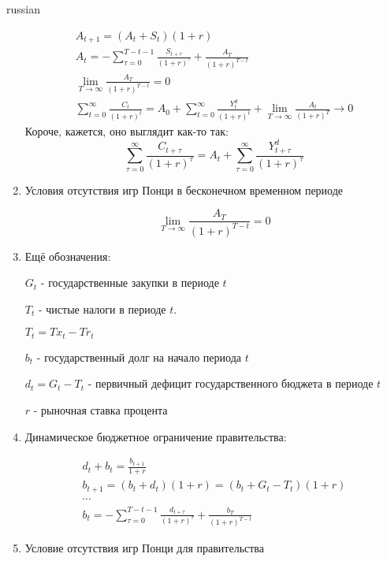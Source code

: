 \documentclass{article}
\begin{document}
\begin{otherlanguage*}{russian}
\begin{enumerate}
\begin{align}
A_{t+1} = (A_t + S_t) (1 + r) \\
A_t = - \sum_{\tau = 0 } ^{T - t -1 } \frac{S_{t + \tau}}{(1 + r)^{\tau}} + \frac{A_T}{(1 + r)^{T - t}}\\
\lim_{T \rightarrow \infty} \frac{A_T}{(1 + r)^{T - t}} = 0 \\
\sum_{t = 0}^{\infty} \frac{C_t}{(1 + r)^t} = A_0 + \sum_{t = 0 }^{\infty} \frac{Y^d_t}{(1 + r)^t} + \lim_{T \rightarrow \infty} \frac{A_t}{(1 + r)^T} \rightarrow 0
\end{align}
Короче, кажется, оно выглядит как-то так:
\begin{equation}
\sum_{\tau = 0}^{\infty} \frac{C_{t + \tau}}{(1 + r)^{\tau}} = A_t + \sum_{\tau = 0}^{\infty} \frac{Y^d_{t + \tau}}{(1 + r)^{\tau}} 
\end{equation}
\item Условия отсутствия игр Понци в бесконечном временном периоде 

\begin{equation}
\lim_{T \rightarrow \infty} \frac{A_T}{(1 + r)^{T - t}} = 0 
\end{equation}

\item Ещё обозначения:

$  G_t $ - государственные закупки в периоде $ t$ 

$ T_t$ - чистые налоги в периоде $t$.

$ T_t = T x_t - Tr_t $

$ b_t $ - государственный долг на начало периода $t$
 
$d_t = G_t - T_t$ - первичный дефицит государственного бюджета в периоде $ t $ 

$ r $ - рыночная ставка процента 

\item Динамическое бюджетное ограничение правительства: 

\begin{align}
d_t + b_t = \frac{b_{t+1}}{1 +r} \\
b_{t+1} = (b_t + d_t) (1 + r) = (b_t + G_t - T_t) (1 + r) \\
\cdots \\ 
b_t = - \sum_{\tau = 0}^{T - t - 1} \frac{d_{t + \tau}}{(1 + r) ^{\tau}} + \frac{b_T}{(1 + r)^{T -t}}
\end{align}

\item Условие отсутствия игр Понци для правительства


\end{enumerate}
\end{otherlanguage*}
\end{document}
